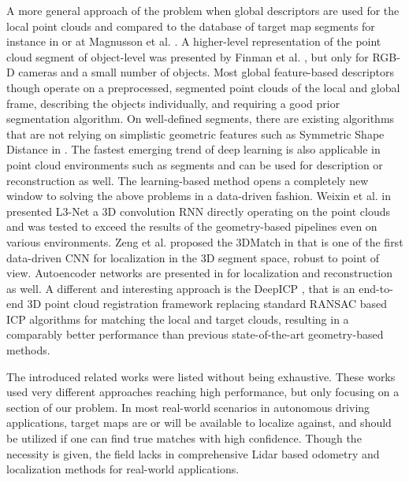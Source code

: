 \documentclass[letterpaper, 10 pt, conference]{ieeeconf}  %
\begin{document}
A more general approach of the problem when global descriptors are used for the local point clouds and compared to the database of target map segments for instance in \cite{rohling} or at Magnusson et al. \cite{magnusson}.
A higher-level representation of the point cloud segment of object-level was presented by Finman et al. \cite{object}, but only for RGB-D cameras and a small number of objects. Most global feature-based descriptors though operate on a preprocessed, segmented point clouds of the local and global frame, describing the objects individually, and requiring a good prior segmentation algorithm. On well-defined segments, there are existing algorithms that are not relying on simplistic geometric features such as Symmetric Shape Distance in \cite{ssdistance}. The fastest emerging trend of deep learning is also applicable in point cloud environments such as segments and can be used for description or reconstruction as well. The learning-based method opens a completely new window to solving the above problems in a data-driven fashion. Weixin et al. in \cite{l3net} presented L3-Net a 3D convolution RNN directly operating on the point clouds and was tested to exceed the results of the geometry-based pipelines even on various environments. Zeng et al. proposed the 3DMatch in \cite{3dmatch} that is one of the first data-driven CNN for localization in the 3D segment space, robust to point of view. Autoencoder networks are presented in \cite{autoe1, autoe2} for localization and reconstruction as well. A different and interesting approach is the DeepICP \cite{deepicp}, that is an end-to-end 3D point cloud registration framework replacing standard RANSAC based ICP algorithms for matching the local and target clouds, resulting in a comparably better performance than previous state-of-the-art geometry-based methods. %

The introduced related works were listed without being exhaustive. 
These works used very different approaches reaching high performance, but only focusing on a section of our problem. In most real-world scenarios in autonomous driving applications, target maps are or will be available to localize against, and should be utilized if one can find true matches with high confidence. Though the necessity is given, the field lacks in comprehensive Lidar based odometry and localization methods for real-world applications.
\end{document}
